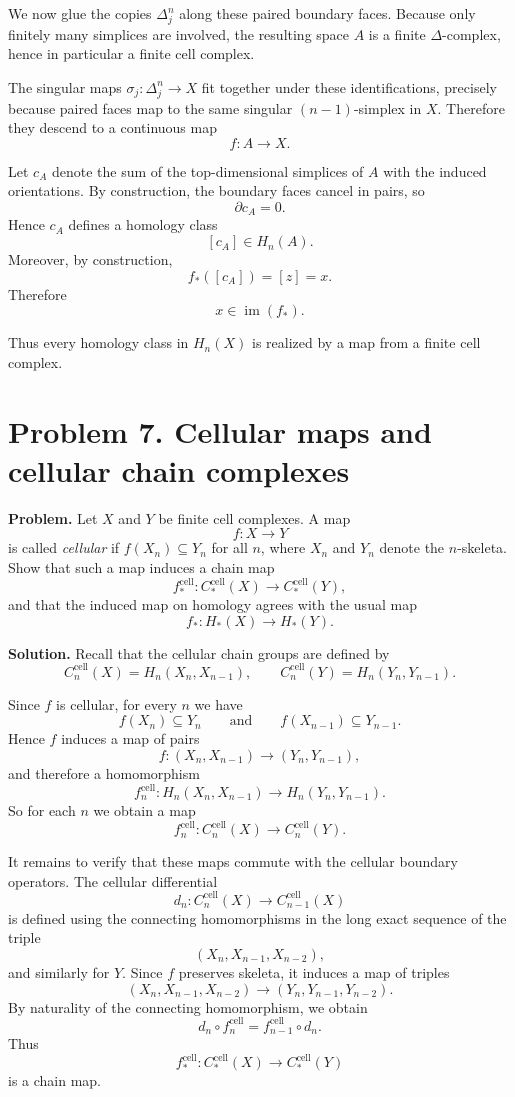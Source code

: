 \documentclass[12pt,a4paper]{article}
\theoremstyle{notespace}
\begin{document}
We now glue the copies \(\Delta_j^n\) along these paired boundary faces. Because only finitely many simplices are involved, the resulting space \(A\) is a finite \(\Delta\)-complex, hence in particular a finite cell complex.

The singular maps \(\sigma_j:\Delta_j^n\to X\) fit together under these identifications, precisely because paired faces map to the same singular \((n-1)\)-simplex in \(X\). Therefore they descend to a continuous map
\[
f:A\to X.
\]

Let \(c_A\) denote the sum of the top-dimensional simplices of \(A\) with the induced orientations. By construction, the boundary faces cancel in pairs, so
\[
\partial c_A=0.
\]
Hence \(c_A\) defines a homology class
\[
[c_A]\in H_n(A).
\]
Moreover, by construction,
\[
f_*([c_A])=[z]=x.
\]
Therefore
\[
x\in \operatorname{im}(f_*).
\]

\medskip

Thus every homology class in \(H_n(X)\) is realized by a map from a finite cell complex.

\bigskip

\section{Problem 7. Cellular maps and cellular chain complexes}

\textbf{Problem.} Let \(X\) and \(Y\) be finite cell complexes. A map
\[
f:X\to Y
\]
is called \emph{cellular} if \(f(X_n)\subseteq Y_n\) for all \(n\), where \(X_n\) and \(Y_n\) denote the \(n\)-skeleta. Show that such a map induces a chain map
\[
f_*^{\mathrm{cell}}:C_*^{\mathrm{cell}}(X)\to C_*^{\mathrm{cell}}(Y),
\]
and that the induced map on homology agrees with the usual map
\[
f_*:H_*(X)\to H_*(Y).
\]

\medskip

\textbf{Solution.}
Recall that the cellular chain groups are defined by
\[
C_n^{\mathrm{cell}}(X)=H_n(X_n,X_{n-1}),
\qquad
C_n^{\mathrm{cell}}(Y)=H_n(Y_n,Y_{n-1}).
\]

Since \(f\) is cellular, for every \(n\) we have
\[
f(X_n)\subseteq Y_n
\qquad\text{and}\qquad
f(X_{n-1})\subseteq Y_{n-1}.
\]
Hence \(f\) induces a map of pairs
\[
f:(X_n,X_{n-1})\to (Y_n,Y_{n-1}),
\]
and therefore a homomorphism
\[
f_n^{\mathrm{cell}}:
H_n(X_n,X_{n-1})\longrightarrow H_n(Y_n,Y_{n-1}).
\]
So for each \(n\) we obtain a map
\[
f_n^{\mathrm{cell}}:C_n^{\mathrm{cell}}(X)\to C_n^{\mathrm{cell}}(Y).
\]

It remains to verify that these maps commute with the cellular boundary operators. The cellular differential
\[
d_n:C_n^{\mathrm{cell}}(X)\to C_{n-1}^{\mathrm{cell}}(X)
\]
is defined using the connecting homomorphisms in the long exact sequence of the triple
\[
(X_n,X_{n-1},X_{n-2}),
\]
and similarly for \(Y\). Since \(f\) preserves skeleta, it induces a map of triples
\[
(X_n,X_{n-1},X_{n-2})\to (Y_n,Y_{n-1},Y_{n-2}).
\]
By naturality of the connecting homomorphism, we obtain
\[
d_n\circ f_n^{\mathrm{cell}}
=
f_{n-1}^{\mathrm{cell}}\circ d_n.
\]
Thus
\[
f_*^{\mathrm{cell}}:C_*^{\mathrm{cell}}(X)\to C_*^{\mathrm{cell}}(Y)
\]
is a chain map.
\end{document}

